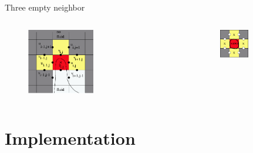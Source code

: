 \documentclass{beamer}
\begin{document}
	\begin{frame}{Three empty neighbor}
	  \begin{columns}
	 	\begin{column}[c]{0.4\textwidth}
	 	   \begin{figure}
			\includegraphics[width=0.49\textwidth]{pic/three.pdf}
			\end{figure}
		\end{column}
		\begin{column}[c]{0.4\textwidth}
	 	   \begin{figure}
	 	   			\includegraphics[width=0.49\textwidth]{pic/four.pdf}
			\end{figure}
		\end{column}
	\end{columns}
   \end{frame}	
		
 	
\section{Implementation} 
\end{document}
